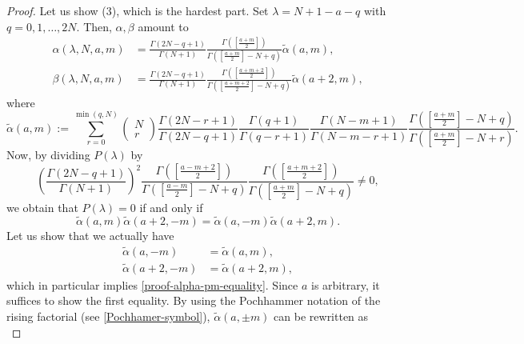 \documentclass[10pt,a4paper]{amsart}
\begin{document}
\begin{proof}
Let us show (3), which is the hardest part. Set $\lambda = N+1-a-q$ with $q = 0, 1, \ldots, 2N$. Then, $\alpha, \beta$ amount to
\begin{align*}
\alpha(\lambda, N, a, m) &= \frac{\Gamma(2N-q+1)}{\Gamma(N+1)}\frac{\Gamma(\left[\frac{a+m}{2}\right])}{\Gamma(\left[\frac{a+m}{2}\right] -N + q)}\widetilde{\alpha}(a, m),\\
\beta(\lambda, N, a, m) &= \frac{\Gamma(2N-q+1)}{\Gamma(N+1)}\frac{\Gamma(\left[\frac{a+m+2}{2}\right])}{\Gamma(\left[\frac{a+m+2}{2}\right] -N + q)}\widetilde{\alpha}(a+2, m),
\end{align*}
where
\begin{equation*}
\widetilde{\alpha}(a, m) := \sum_{r=0}^{\min(q,N)}\begin{pmatrix}
N\\
r
\end{pmatrix} 
\frac{\Gamma(2N-r+1)}{\Gamma(2N-q+1)}\frac{\Gamma(q+1)}{\Gamma(q-r+1)}\frac{\Gamma(N-m+1)}{\Gamma(N-m-r+1)}\frac{\Gamma(\left[\frac{a+m}{2}\right] -N + q)}{\Gamma(\left[\frac{a+m}{2}\right] -N + r)}.
\end{equation*}
Now, by dividing $P(\lambda)$ by
\begin{equation}\label{proof-constant-dividing}
\left(\frac{\Gamma(2N-q+1)}{\Gamma(N+1)}\right)^2 \frac{\Gamma(\left[\frac{a-m+2}{2}\right])}{\Gamma(\left[\frac{a-m}{2}\right] -N + q)}\frac{\Gamma(\left[\frac{a+m+2}{2}\right])}{\Gamma(\left[\frac{a+m}{2}\right] -N + q)} \neq 0,
\end{equation}
we obtain that $P(\lambda) = 0$ if and only if 
\begin{equation}\label{proof-alpha-pm-equality}
\widetilde{\alpha}(a, m)\widetilde{\alpha}(a+2, -m) = \widetilde{\alpha}(a, -m)\widetilde{\alpha}(a+2, m).
\end{equation}
Let us show that we actually have
\begin{equation*}
\begin{aligned}
\widetilde{\alpha}(a, -m) &= \widetilde{\alpha}(a, m),\\
\widetilde{\alpha}(a+2, -m) &= \widetilde{\alpha}(a+2, m),
\end{aligned}
\end{equation*}
which in particular implies \eqref{proof-alpha-pm-equality}. Since $a$ is arbitrary, it suffices to show the first equality. By using the Pochhammer notation of the rising factorial (see \eqref{Pochhamer-symbol}), $\widetilde{\alpha}(a, \pm m)$ can be rewritten as
\begin{equation}\label{proof-alpha-hypergeometric}

\end{equation}
\end{proof}
\end{document}
